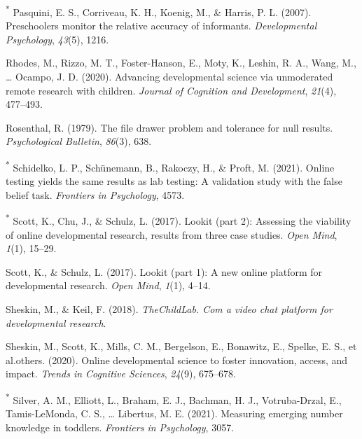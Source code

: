 \documentclass[
  man,floatsintext]{apa6}
\newlength{\cslhangindent}
\newlength{\cslentryspacingunit} %
\newenvironment{CSLReferences}[2] %
 {%
  \setlength{\parindent}{0pt}
  \ifodd #1
  \let\oldpar\par
  \def\par{\hangindent=\cslhangindent\oldpar}
  \fi
  \setlength{\parskip}{#2\cslentryspacingunit}
 }%
 {}
\begin{document}
\begin{CSLReferences}{1}{0}
\leavevmode{}%
\textsuperscript{*} Pasquini, E. S., Corriveau, K. H., Koenig, M., \& Harris, P. L. (2007). Preschoolers monitor the relative accuracy of informants. \emph{Developmental Psychology}, \emph{43}(5), 1216.

\leavevmode{}%
Rhodes, M., Rizzo, M. T., Foster-Hanson, E., Moty, K., Leshin, R. A., Wang, M., \ldots{} Ocampo, J. D. (2020). Advancing developmental science via unmoderated remote research with children. \emph{Journal of Cognition and Development}, \emph{21}(4), 477--493.

\leavevmode{}%
Rosenthal, R. (1979). The file drawer problem and tolerance for null results. \emph{Psychological Bulletin}, \emph{86}(3), 638.

\leavevmode{}%
\textsuperscript{*} Schidelko, L. P., Schünemann, B., Rakoczy, H., \& Proft, M. (2021). Online testing yields the same results as lab testing: A validation study with the false belief task. \emph{Frontiers in Psychology}, 4573.

\leavevmode{}%
\textsuperscript{*} Scott, K., Chu, J., \& Schulz, L. (2017). Lookit (part 2): Assessing the viability of online developmental research, results from three case studies. \emph{Open Mind}, \emph{1}(1), 15--29.

\leavevmode{}%
Scott, K., \& Schulz, L. (2017). Lookit (part 1): A new online platform for developmental research. \emph{Open Mind}, \emph{1}(1), 4--14.

\leavevmode{}%
Sheskin, M., \& Keil, F. (2018). \emph{TheChildLab. Com a video chat platform for developmental research}.

\leavevmode{}%
Sheskin, M., Scott, K., Mills, C. M., Bergelson, E., Bonawitz, E., Spelke, E. S., et al.others. (2020). Online developmental science to foster innovation, access, and impact. \emph{Trends in Cognitive Sciences}, \emph{24}(9), 675--678.

\leavevmode{}%
\textsuperscript{*} Silver, A. M., Elliott, L., Braham, E. J., Bachman, H. J., Votruba-Drzal, E., Tamis-LeMonda, C. S., \ldots{} Libertus, M. E. (2021). Measuring emerging number knowledge in toddlers. \emph{Frontiers in Psychology}, 3057.


\end{CSLReferences}
\end{document}
